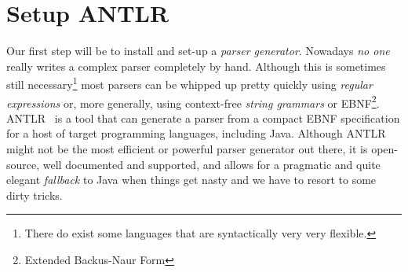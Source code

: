 \section{Setup ANTLR}

Our first step will be to install and set-up a \emph{parser generator}.
Nowadays \emph{no one} really writes a complex parser completely by hand.
Although this is sometimes still necessary\footnote{There do exist some languages that are syntactically very very flexible.} most parsers can be whipped up pretty quickly using \emph{regular expressions} or, more generally, using context-free \emph{string grammars} or EBNF\footnote{Extended Backus-Naur Form}.
ANTLR~\cite{ANTLR} is a tool that can generate a parser from a compact EBNF specification for a host of target programming languages, including Java.
Although ANTLR might not be the most efficient or powerful parser generator out there, it is open-source, well documented and supported, and allows for a pragmatic and quite elegant \emph{fallback} to Java when things get nasty and we have to resort to some dirty tricks.

